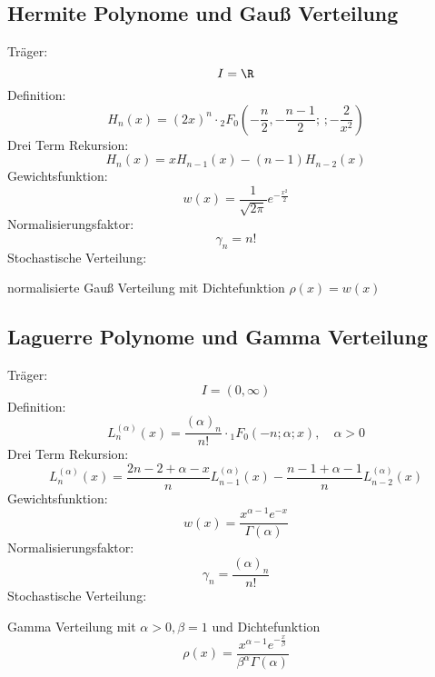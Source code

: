 \subsection{Hermite Polynome und Gauß Verteilung}
Träger:
\[I=\R\]
Definition:
\[H_n(x)=(2x)^n\cdot {_2F_0}\left(-\frac{n}{2},-\frac{n-1}{2};\, ;-\frac{2}{x^2}\right)\]
Drei Term Rekursion:
\[H_{n}(x)=xH_{n-1}(x)-(n-1)H_{n-2}(x)\]
Gewichtsfunktion:
\[w(x)=\frac{1}{\sqrt{2\pi}}e^{-\frac{x^2}{2}}\]
Normalisierungsfaktor:
\[\gamma_n=n!\]
Stochastische Verteilung:
\begin{center}
normalisierte Gauß Verteilung mit Dichtefunktion $\rho(x)=w(x)$
\end{center}

\subsection{Laguerre Polynome und Gamma Verteilung}
Träger:
\[I=(0,\infty)\]
Definition:
\[L_n^{(\alpha)}(x)=\frac{(\alpha)_n}{n!}\cdot {_1F_0}\left(-n;\alpha;x\right),\quad \alpha>0\]
Drei Term Rekursion:
\[L_{n}^{(\alpha)}(x)=\frac{2n-2+\alpha -x}{n}L_{n-1}^{(\alpha)}(x)-\frac{n-1+\alpha - 1}{n}L_{n-2}^{(\alpha)}(x)\]
Gewichtsfunktion:
\[w(x)=\frac{x^{\alpha-1}e^{-x}}{\Gamma(\alpha)}\]
Normalisierungsfaktor:
\[\gamma_n=\frac{(\alpha)_n}{n!}\]
Stochastische Verteilung:
\begin{center}
Gamma Verteilung mit $\alpha>0,\beta=1$ und Dichtefunktion
\[\rho(x)=\frac{x^{\alpha-1}e^{-\frac{x}{\beta}}}{\beta^{\alpha}\Gamma(\alpha)}\]
\end{center}

